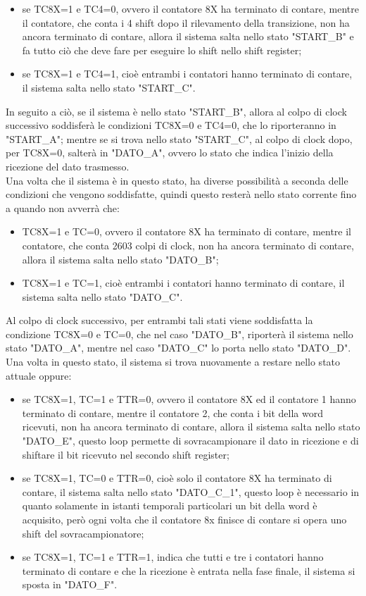 \documentclass[a4paper, titlepage]{article}
\begin{document}
\begin{itemize}
    \item se TC8X=1 e TC4=0, ovvero il contatore 8X ha terminato di contare, mentre il contatore, che conta i 4 shift dopo il rilevamento della transizione, non ha ancora terminato di contare, allora il sistema salta nello stato "START\_B" e fa tutto ciò che deve fare per eseguire lo shift nello shift register;
    \item se TC8X=1 e TC4=1, cioè entrambi i contatori hanno terminato di contare, il sistema salta nello stato "START\_C".
\end{itemize}
In seguito a ciò, se il sistema è nello stato "START\_B", allora al colpo di clock successivo soddisferà le condizioni TC8X=0 e TC4=0, che lo riporteranno in "START\_A"; mentre se si trova nello stato "START\_C", al colpo di clock dopo, per TC8X=0, salterà in "DATO\_A", ovvero lo stato che indica l'inizio della ricezione del dato trasmesso.\\Una volta che il sistema è in questo stato, ha diverse possibilità a seconda delle condizioni che vengono soddisfatte, quindi questo resterà nello stato corrente fino a quando non avverrà che:
\begin{itemize}
    \item TC8X=1 e TC=0, ovvero il contatore 8X ha terminato di contare, mentre il contatore, che conta 2603 colpi di clock, non ha ancora terminato di contare, allora il sistema salta nello stato "DATO\_B";
    \item TC8X=1 e TC=1, cioè entrambi i contatori hanno terminato di contare, il sistema salta nello stato "DATO\_C".
\end{itemize}
Al colpo di clock successivo, per entrambi tali stati viene soddisfatta la condizione TC8X=0 e TC=0, che nel caso "DATO\_B", riporterà il sistema nello stato "DATO\_A", mentre nel caso "DATO\_C" lo porta nello stato "DATO\_D".\\Una volta in questo stato, il sistema si trova nuovamente a restare nello stato attuale oppure:
\begin{itemize}
    \item se TC8X=1, TC=1 e TTR=0, ovvero il contatore 8X ed il contatore 1 hanno terminato di contare, mentre il contatore 2, che conta i bit della word ricevuti, non ha ancora terminato di contare, allora il sistema salta nello stato "DATO\_E", questo loop permette di sovracampionare il dato in ricezione e di shiftare il bit ricevuto nel secondo shift register;
    \item se TC8X=1, TC=0 e TTR=0, cioè solo il contatore 8X ha terminato di contare, il sistema salta nello stato "DATO\_C\_1", questo loop è necessario in quanto solamente in istanti temporali particolari un bit della word è acquisito, però ogni volta che il contatore 8x finisce di contare si opera uno shift del sovracampionatore;
    \item se TC8X=1, TC=1 e TTR=1, indica che tutti e tre i contatori hanno terminato di contare e che la ricezione è entrata nella fase finale, il sistema si sposta in "DATO\_F".
\end{itemize}
\end{document}
